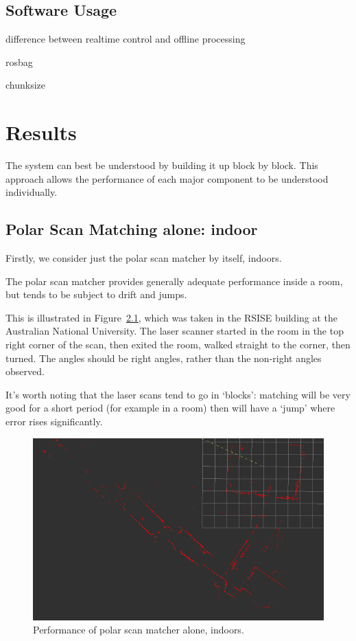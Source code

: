 \documentclass[12pt,oneside,a4paper]{book}
\begin{document}
\section{Software Usage}
\label{sec:software-usage}

difference between realtime control and offline processing

rosbag

chunksize

\chapter{Results}
\label{cha:results}

The system can best be understood by building it up block by
block. This approach allows the performance of each major component to
be understood individually.

\section{Polar Scan Matching alone: indoor}
\label{sec:psm-indoor}

Firstly, we consider just the polar scan matcher by itself, indoors.

The polar scan matcher provides generally adequate performance inside
a room, but tends to be subject to drift and jumps. 

This is illustrated in Figure~\ref{fig:psm-indoors}, which was taken
in the RSISE building at the Australian National University. The laser
scanner started in the room in the top right corner of the scan, then
exited the room, walked straight to the corner, then turned. The
angles should be right angles, rather than the non-right angles
observed.

It's worth noting that the laser scans tend to go in `blocks':
matching will be very good for a short period (for example in a room)
then will have a `jump' where error rises significantly.

\begin{figure}[h!]
  \centering
  \includegraphics[width=\textwidth]{figs/indoor}
  \caption{Performance of polar scan matcher alone, indoors.}
  \label{fig:psm-indoors}
\end{figure}
\end{document}
